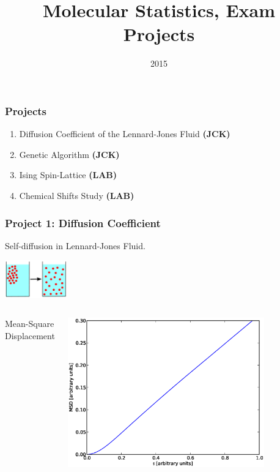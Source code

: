 \documentclass{beamer}
\title[University of Copenhagen]{Molecular Statistics, Exam Projects}
\author{
}
\date{2015}
\begin{document}
\frame[plain]{\titlepage}



\frame
{
    \frametitle{Projects}

    \begin{enumerate}
      \item Diffusion Coefficient of the Lennard-Jones Fluid {\bf (JCK)}
      \item Genetic Algorithm {\bf (JCK)}
      \item Ising Spin-Lattice {\bf (LAB)}
      \item Chemical Shifts Study {\bf (LAB)}
    \end{enumerate}
}

\frame
{
    \frametitle{Project 1: Diffusion Coefficient}
    \centering

    Self-diffusion in Lennard-Jones Fluid.
    \newline

    \includegraphics[width=0.2\textwidth]{images/diffusion_illustration.png}

    \begin{columns}[c]
      \centering

        Mean-Square Displacement

        \includegraphics[width=0.8\textwidth]{images/diffusion_msd.eps}

      \centering


\end{columns}}
\end{document}

